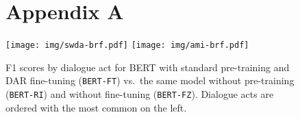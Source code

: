 
\begin{figure*}[!ht]
\section*{Appendix A}

\vspace{10em}

  \centering
  \texttt{[image: img/swda-brf.pdf]}
  \texttt{[image: img/ami-brf.pdf]}
  \caption{F1 scores by dialogue act for BERT with standard pre-training and DAR fine-tuning (\texttt{BERT-FT}) vs.~the same model without pre-training (\texttt{BERT-RI}) and without fine-tuning (\texttt{BERT-FZ}). Dialogue acts are ordered with the most common on the left.}
    \label{fig:f1-by-da}
  \end{figure*}


